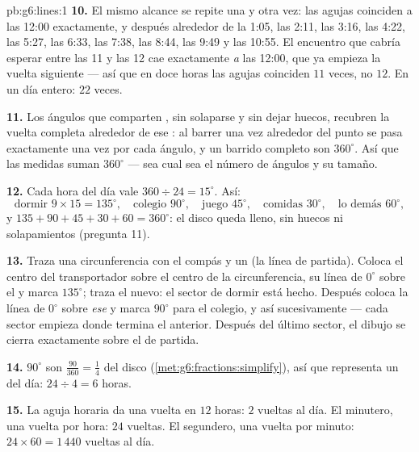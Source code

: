 \begin{solution}{pb:g6:lines:1}
\textbf{10.} El mismo alcance se repite una y otra vez: las
agujas coinciden a las 12:00 exactamente, y después alrededor de la 1:05, las 2:11, las 3:16,
las 4:22, las 5:27, las 6:33, las 7:38, las 8:44, las 9:49 y las 10:55. El encuentro que
cabría esperar entre las 11 y las 12 cae exactamente \emph{a} las 12:00,
que ya empieza la vuelta siguiente --- así que en doce horas las
agujas coinciden $11$ veces, no $12$. En un día entero: $22$ veces.

\textbf{11.} Los ángulos que comparten , sin solaparse y sin dejar
huecos, recubren la vuelta completa alrededor de ese : al barrer una vez alrededor
del punto se pasa exactamente una vez por cada ángulo, y un barrido
completo son $360^\circ$. Así que las medidas suman $360^\circ$ ---
sea cual sea el número de ángulos y su tamaño.

\textbf{12.} Cada hora del día vale
$360 \div 24 = 15^\circ$. Así:
\[
\text{dormir } 9 \times 15 = 135^\circ, \quad
\text{colegio } 90^\circ, \quad
\text{juego } 45^\circ, \quad
\text{comidas } 30^\circ, \quad
\text{lo demás } 60^\circ,
\]
y $135 + 90 + 45 + 30 + 60 = 360^\circ$: el disco queda lleno, sin
huecos ni solapamientos (pregunta 11).

\textbf{13.} Traza una circunferencia con el compás y un  (la
línea de partida). Coloca el centro del transportador sobre el centro de
la circunferencia, su línea de $0^\circ$ sobre el  y marca
$135^\circ$; traza el  nuevo: el sector de dormir está hecho. Después
coloca la línea de $0^\circ$ sobre \emph{ese}  y marca
$90^\circ$ para el colegio, y así sucesivamente --- cada sector empieza donde
termina el anterior. Después del último sector, el dibujo se cierra
exactamente sobre el  de partida.

\textbf{14.} $90^\circ$ son $\frac{90}{360} = \frac14$ del
disco (\cref{met:g6:fractions:simplify}), así que representa un
 del día: $24 \div 4 = 6$ horas.

\textbf{15.} La aguja horaria da una vuelta en $12$ horas: $2$
vueltas al día. El minutero, una vuelta por hora: $24$ vueltas.
El segundero, una vuelta por minuto: $24 \times 60 = 1\,440$
vueltas al día.
\end{solution}
